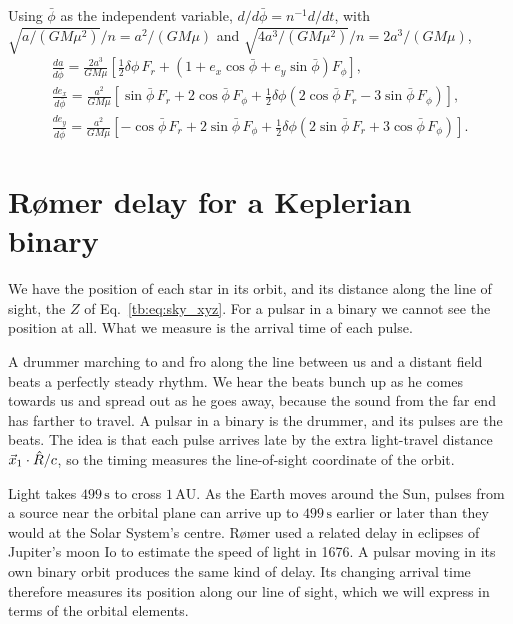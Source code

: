 	Using $\bar\phi$ as the independent variable, $d/d\bar\phi=n^{-1}d/dt$, with $\sqrt{a/(GM\mu^2)}/n=a^2/(GM\mu)$ and $\sqrt{4a^3/(GM\mu^2)}/n=2a^3/(GM\mu)$,
	\begin{align}
		\boxed{
			\frac{da}{d\bar\phi}
			=
			\frac{2a^3}{GM\mu}
			\left[
			\tfrac12\delta\phi\,F_r
			+
			\left(
			1+e_x\cos\bar\phi+e_y\sin\bar\phi
			\right)F_{\phi}
			\right],
		}
		\label{eq:LL_dadPhi}
		\\
		\boxed{
			\frac{de_x}{d\bar\phi}
			=
			\frac{a^2}{GM\mu}
			\left[
			\sin\bar\phi\,F_r
			+
			2\cos\bar\phi\,F_{\phi}
			+
			\tfrac12\delta\phi
			\left(
			2\cos\bar\phi\,F_r-3\sin\bar\phi\,F_{\phi}
			\right)
			\right],
		}
		\label{eq:LL_deps1dPhi}
		\\
		\boxed{
			\frac{de_y}{d\bar\phi}
			=
			\frac{a^2}{GM\mu}
			\left[
			-\cos\bar\phi\,F_r
			+
			2\sin\bar\phi\,F_{\phi}
			+
			\tfrac12\delta\phi
			\left(
			2\sin\bar\phi\,F_r+3\cos\bar\phi\,F_{\phi}
			\right)
			\right].
		}
		\label{eq:LL_deps2dPhi}
	\end{align}
	
	
	
	\section{Rømer delay for a Keplerian binary}
	\label{sec:romer}
	
	We have the position of each star in its orbit, and its distance along the line of sight, the $Z$ of Eq.~\eqref{tb:eq:sky_xyz}. 	For a pulsar in a binary we cannot see the position at all. What we measure is the arrival time of each pulse.

	A drummer marching to and fro along the line between us and a distant field beats a perfectly steady rhythm. We hear the beats bunch up as he comes towards us and spread out as he goes away, because the sound from the far end has farther to travel. 	A pulsar in a binary is the drummer, and its pulses are the beats. The idea is that each pulse arrives late by the extra light-travel distance $\vec x_1\cdot\hat R/c$, so the timing measures the line-of-sight coordinate of the orbit.

	Light takes $499\,\mathrm s$ to cross $1\,\mathrm{AU}$. As the Earth moves around the Sun, pulses from a source near the orbital plane can arrive up to $499\,\mathrm s$ earlier or later than they would at the Solar System's centre. R{\o}mer used a related delay in eclipses of Jupiter's moon Io to estimate the speed of light in 1676. A pulsar moving in its own binary orbit produces the same kind of delay. Its changing arrival time therefore measures its position along our line of sight, which we will express in terms of the orbital elements.

